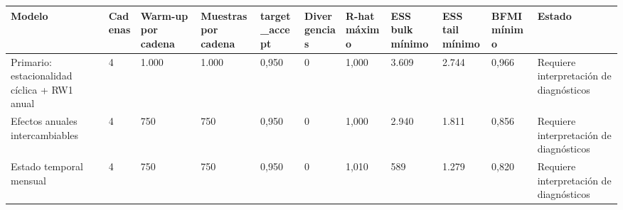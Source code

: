 \begin{tabular}{lllllllllll}
\toprule
Modelo & Cadenas & Warm-up por cadena & Muestras por cadena & target\_accept & Divergencias & R-hat máximo & ESS bulk mínimo & ESS tail mínimo & BFMI mínimo & Estado \\
\midrule
Primario: estacionalidad cíclica + RW1 anual & 4 & 1.000 & 1.000 & 0,950 & 0 & 1,000 & 3.609 & 2.744 & 0,966 & Requiere interpretación de diagnósticos \\
Efectos anuales intercambiables & 4 & 750 & 750 & 0,950 & 0 & 1,000 & 2.940 & 1.811 & 0,856 & Requiere interpretación de diagnósticos \\
Estado temporal mensual & 4 & 750 & 750 & 0,950 & 0 & 1,010 & 589 & 1.279 & 0,820 & Requiere interpretación de diagnósticos \\
\bottomrule
\end{tabular}
